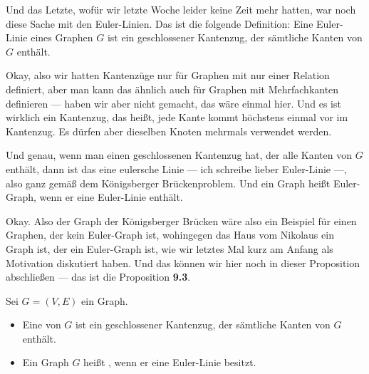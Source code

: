 \begin{spoken-clean}[00:01:58 - 00:04:10]
Und das Letzte, wofür wir letzte Woche leider keine Zeit mehr hatten, war noch diese Sache mit den Euler-Linien. Das ist die folgende Definition: Eine Euler-Linie eines Graphen $G$ ist ein geschlossener Kantenzug, der sämtliche Kanten von $G$ enthält. 

Okay, also wir hatten Kantenzüge nur für Graphen mit nur einer Relation definiert, aber man kann das ähnlich auch für Graphen mit Mehrfachkanten definieren --- haben wir aber nicht gemacht, das wäre einmal hier. Und es ist wirklich ein Kantenzug, das heißt, jede Kante kommt höchstens einmal vor im Kantenzug. Es dürfen aber dieselben Knoten mehrmals verwendet werden.

Und genau, wenn man einen geschlossenen Kantenzug hat, der alle Kanten von $G$ enthält, dann ist das eine eulersche Linie --- ich schreibe lieber Euler-Linie ---, also ganz gemäß dem Königsberger Brückenproblem. Und ein Graph heißt Euler-Graph, wenn er eine Euler-Linie enthält. 

Okay. Also der Graph der Königsberger Brücken wäre also ein Beispiel für einen Graphen, der kein Euler-Graph ist, wohingegen das Haus vom Nikolaus ein Graph ist, der ein Euler-Graph ist, wie wir letztes Mal kurz am Anfang als Motivation diskutiert haben. Und das können wir hier noch in dieser Proposition abschließen --- das ist die Proposition \textbf{9.3}.
\end{spoken-clean}

\begin{math-stroke}
\begin{definition}\label{def:euler-linie}
Sei $G = (V, E)$ ein Graph.
\begin{itemize}
    \item Eine  von $G$ ist ein geschlossener Kantenzug, der sämtliche Kanten von $G$ enthält.
    \item Ein Graph $G$ heißt , wenn er eine Euler-Linie besitzt.
\end{itemize}
\end{definition}
\end{math-stroke}

